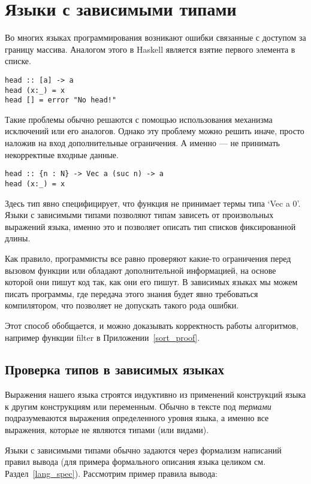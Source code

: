 \section{Языки с зависимыми типами} \label{deptypes_intro}
Во многих языках программирования возникают ошибки связанные с доступом за границу массива.
Аналогом этого в Haskell является взятие первого элемента в списке.

\begin{lstlisting}[frame=single]
head :: [a] -> a
head (x:_) = x
head [] = error "No head!"
\end{lstlisting}

Такие проблемы обычно решаются с помощью использования механизма исключений или его аналогов. Однако эту проблему можно решить иначе, просто наложив на вход дополнительные ограничения. А именно --- не принимать некорректные входные данные.

\begin{lstlisting}[frame=single]
head :: {n : N} -> Vec a (suc n) -> a
head (x:_) = x
\end{lstlisting}

Здесь тип явно специфицирует, что функция не принимает термы типа `Vec a 0'. Языки с зависимыми типами позволяют типам зависеть от произвольных выражений языка, именно это и позволяет описать тип списков фиксированной длины.

Как правило, программисты все равно проверяют какие-то ограничения перед вызовом функции или обладают дополнительной информацией, на основе которой они пишут код так, как они его пишут. В зависимых языках мы можем писать программы, где передача этого знания будет явно требоваться компилятором, что позволяет не допускать такого рода ошибки.

Этот способ обобщается, и можно доказывать корректность работы алгоритмов, например функции filter в Приложении~\ref{sort_proof}.

\subsection{Проверка типов в зависимых языках}\label{typecheck}
Выражения нашего языка строятся индуктивно из применений конструкций языка к другим конструкциям или переменным. Обычно в тексте под \textit{термами} подразумеваются выражения определенного уровня языка, а именно все выражения, которые не являются типами (или видами).

Языки с зависимыми типами обычно задаются через формализм написаний правил вывода (для примера формального описания языка целиком см. Раздел~\ref{lang_spec}). Рассмотрим пример правила вывода:

